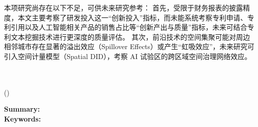\documentclass[12pt,hyperref,a4paper,UTF8]{ctexart}
\newcommand{\enmaketitle}{%
\vspace{2em}
\begin{center}
{\bfseries \Large \the\entitle}\\
\the\enauthor\\
\small(\the\eninstitute)
\end{center}
\vspace*{-2ex}
\noindent\small\textbf{Summary:}\the\enabstract \\
\textbf{Keywords:} \the\enkeywords
}
\begin{document}
本项研究尚存在以下不足，可供未来研究参考：
首先，受限于财务报表的披露精度，本文主要考察了研发投入这一“创新投入”指标，而未能系统考察专利申请、专利引用以及人工智能相关产品的销售占比等“创新产出与质量”指标，未来可结合专利文本挖掘技术进行更深度的质量评估。
其次，前沿技术的空间集聚可能对周边相邻城市存在显著的溢出效应（Spillover Effects）或产生“虹吸效应”，未来研究可引入空间计量模型（Spatial DID），考察 AI 试验区的跨区域空间治理网络效应。

\nocite{*}

\enmaketitle
\end{document}
